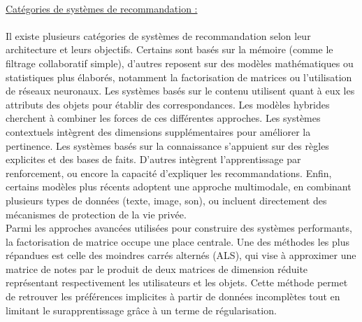\documentclass{article}
\begin{document}
\\
\underline{Catégories de systèmes de recommandation :}\\
\\
Il existe plusieurs catégories de systèmes de recommandation selon leur architecture et leurs objectifs. Certains sont basés sur la mémoire (comme le filtrage collaboratif simple), d’autres reposent sur des modèles mathématiques ou statistiques plus élaborés, notamment la factorisation de matrices ou l’utilisation de réseaux neuronaux. Les systèmes basés sur le contenu utilisent quant à eux les attributs des objets pour établir des correspondances.
Les modèles hybrides cherchent à combiner les forces de ces différentes approches. Les systèmes contextuels intègrent des dimensions supplémentaires pour améliorer la pertinence. Les systèmes basés sur la connaissance s’appuient sur des règles explicites et des bases de faits. D’autres intègrent l’apprentissage par renforcement, ou encore la capacité d’expliquer les recommandations. Enfin, certains modèles plus récents adoptent une approche multimodale, en combinant plusieurs types de données (texte, image, son), ou incluent directement des mécanismes de protection de la vie privée.
\\
Parmi les approches avancées utilisées pour construire des systèmes performants, la factorisation de matrice occupe une place centrale. Une des méthodes les plus répandues est celle des moindres carrés alternés (ALS), qui vise à approximer une matrice de notes par le produit de deux matrices de dimension réduite représentant respectivement les utilisateurs et les objets. Cette méthode permet de retrouver les préférences implicites à partir de données incomplètes tout en limitant le surapprentissage grâce à un terme de régularisation.\\
\end{document}
